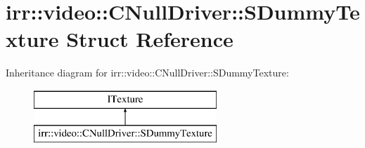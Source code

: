 \hypertarget{structirr_1_1video_1_1_c_null_driver_1_1_s_dummy_texture}{\section{irr\-:\-:video\-:\-:C\-Null\-Driver\-:\-:S\-Dummy\-Texture Struct Reference}
\label{structirr_1_1video_1_1_c_null_driver_1_1_s_dummy_texture}
}
Inheritance diagram for irr\-:\-:video\-:\-:C\-Null\-Driver\-:\-:S\-Dummy\-Texture\-:\begin{figure}[H]
\begin{center}
\leavevmode
\includegraphics[height=2.000000cm]{structirr_1_1video_1_1_c_null_driver_1_1_s_dummy_texture}
\end{center}
\end{figure}
